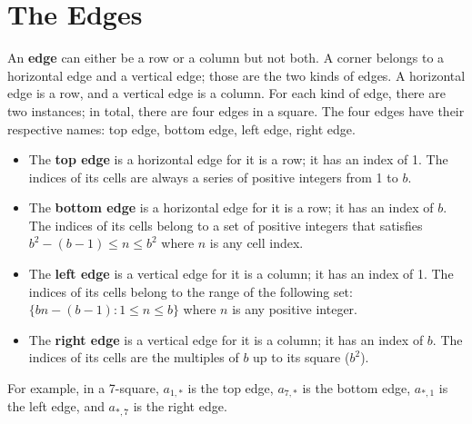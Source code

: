 \documentclass[letterpaper, twoside,12pt]{book}
\begin{document}
    \section{The Edges} \label{edges}
    An \textbf{edge} can either be a row or a column but not both. A corner belongs to a horizontal edge and a vertical edge; those are the two kinds of edges. A horizontal edge is a row, and a vertical edge is a column. For each kind of edge, there are two instances; in total, there are four edges in a square. The four edges have their respective names: top edge, bottom edge, left edge, right edge.
    \begin{itemize}
        \item The \textbf{top edge} is a horizontal edge for it is a row; it has an index of 1. The indices of its cells are always a series of positive integers from 1 to $b$.
        \item The \textbf{bottom edge} is a horizontal edge for it is a row; it has an index of $b$. The indices of its cells belong to a set of positive integers that satisfies $b^2 - (b - 1) \leq n \leq b^2$ where $n$ is any cell index.
        \item The \textbf{left edge} is a vertical edge for it is a column; it has an index of 1. The indices of its cells belong to the range of the following set: $\{bn - (b - 1) : 1 \leq n \leq b\}$ where $n$ is any positive integer.
        \item The \textbf{right edge} is a vertical edge for it is a column; it has an index of $b$. The indices of its cells are the multiples of $b$ up to its square ($b^2$).
    \end{itemize}

    For example, in a 7-square, $a_{1,*}$ is the top edge, $a_{7,*}$ is the bottom edge, $a_{*,1}$ is the left edge, and $a_{*,7}$ is the right edge.
\end{document}
